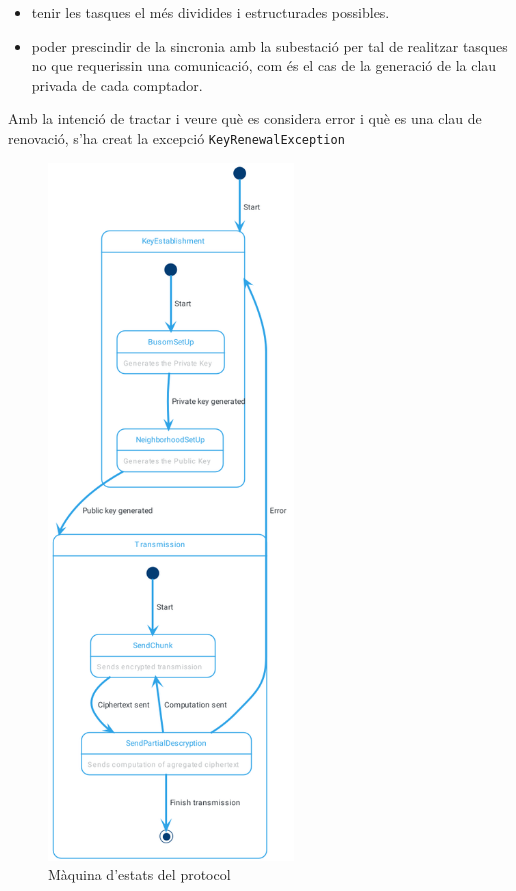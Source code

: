 \begin{itemize}
	\item tenir les tasques el més dividides i estructurades possibles. 
	\item poder prescindir de la sincronia amb la subestació per tal de realitzar tasques no que requerissin una comunicació, com és el cas de la generació de la clau privada de cada comptador.
\end{itemize}
Amb la intenció de tractar i veure què es considera error i què es una clau de renovació, s'ha creat la excepció \texttt{KeyRenewalException}
\begin{figure}[H]
	\centering
	\includegraphics[width=6.5cm]{classes/busomstatemeter.png}
	\caption{Màquina d'estats del protocol \cite{busom}}
	\label{fig:busom-state}
\end{figure}
